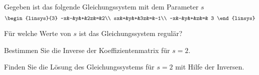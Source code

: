 Gegeben ist das folgende Gleichungssystem mit dem Parameter $s$
\[
\begin{linsys}{3}
-x&-&y&+&2z&=&2\\
sx&+&y&+&3z&=&-1\\
-x&-&y&+&z&=& 3
\end{linsys}
\]
\begin{teilaufgaben}
\item Für welche Werte von $s$ ist das Gleichungssystem regulär?
\item Bestimmen Sie die Inverse der Koeffizientenmatrix für $s=2$.
\item Finden Sie die Lösung des Gleichungssystems für $s=2$ mit Hilfe der Inversen.
\end{teilaufgaben}



